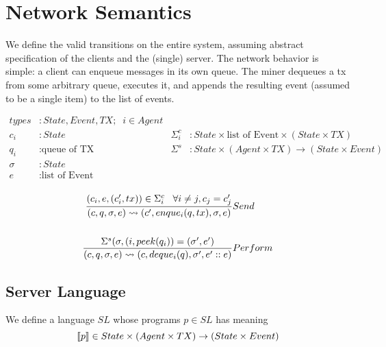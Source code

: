 \documentclass[acmsmall,review,anonymous]{acmart}\settopmatter{printfolios=true}
\begin{document}




\maketitle

\section{Network Semantics}

We define the valid transitions on the entire system, assuming abstract specification of the clients and the (single) server. The network behavior is simple: a client can enqueue messages in its own queue. The miner dequeues a tx from some arbitrary queue, executes it, and appends the resulting event (assumed to be a single item) to the list of events.

\begin{align*}
types &: State, Event, TX; \;\; i \in Agent \\
c_i &: State \; & \Sigma^{c}_{i} &: State \times \text{list of Event} \times (State \times TX) \\
q_i &: \text{queue of TX} \; & \Sigma^{s} &: State \times (Agent \times TX) \rightarrow (State \times Event) \\
\sigma &: State \\
e &: \text{list of Event} \\
\end{align*}

\begin{align*}
\judge{&Send}{
	(c_i, e, (c'_i, tx)) \in \Sigma^{c}_i \;\;\; \forall i\neq j, c_j=c'_j
}{
	(c, q, \sigma, e) \leadsto (c', enque_i(q, tx), \sigma, e)
}
\\
\\
\judge{&Perform}{
    \Sigma^{s}(\sigma, (i, peek(q_i) ) = (\sigma', e')
}{
	(c, q, \sigma, e) \leadsto (c, deque_i(q), \sigma', e'::e)
}
\end{align*}

\pagebreak

\setlength{\grammarindent }{2cm}

\subsection{Server Language}

We define a language $SL$ whose programs $p\in SL$ has meaning \[\semfunc[p] \in State \times (Agent \times TX) \rightarrow (State \times Event)\]
\end{document}
